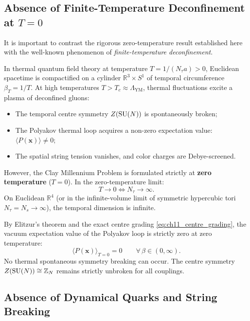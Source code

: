 \subsection{Absence of Finite-Temperature Deconfinement at \texorpdfstring{$T = 0$}{T = 0}}
\label{subsec:absence_thermal_deconfinement}

It is important to contrast the rigorous zero-temperature result established here with the well-known phenomenon of \emph{finite-temperature deconfinement}.

In thermal quantum field theory at temperature $T = 1 / (N_\tau a) > 0$, Euclidean spacetime is compactified on a cylinder $\mathbb{R}^3 \times S^1$ of temporal circumference $\beta_T = 1/T$. At high temperatures $T > T_c \approx \Lambda_{\mathrm{YM}}$, thermal fluctuations excite a plasma of deconfined gluons:
\begin{itemize}
    \item The temporal centre symmetry $Z(\mathrm{SU}(N))$ is spontaneously broken;
    \item The Polyakov thermal loop acquires a non-zero expectation value: $\langle P(\mathbf{x}) \rangle \neq 0$;
    \item The spatial string tension vanishes, and color charges are Debye-screened.
\end{itemize}

However, the Clay Millennium Problem is formulated strictly at \textbf{zero temperature} ($T = 0$). In the zero-temperature limit:
\begin{equation}
\label{eq:ch11_zero_temp_limit}
T \to 0 \iff N_\tau \to \infty.
\end{equation}
On Euclidean $\mathbb{R}^4$ (or in the infinite-volume limit of symmetric hypercubic tori $N_\tau = N_s \to \infty$), the temporal dimension is infinite. 

By Elitzur's theorem \cite{Elitzur1975} and the exact centre grading \eqref{eq:ch11_centre_grading}, the vacuum expectation value of the Polyakov loop is strictly zero at zero temperature:
\begin{equation}
\label{eq:ch11_polyakov_vev_zero}
\langle P(\mathbf{x}) \rangle_{T=0} = 0 \qquad \forall \, \beta \in (0, \infty).
\end{equation}
No thermal spontaneous symmetry breaking can occur. The centre symmetry $Z(\mathrm{SU}(N)) \cong \mathbb{Z}_N$ remains strictly unbroken for all couplings.

\subsection{Absence of Dynamical Quarks and String Breaking}
\label{subsec:absence_string_breaking}

